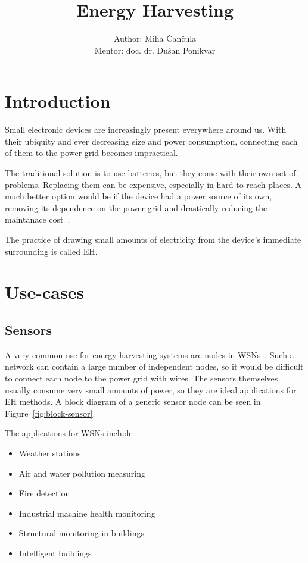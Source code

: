 \documentclass[a4paper,10pt]{article}
\title{Energy Harvesting}
\author{Author: Miha \v Can\v cula \\ Mentor: doc. dr. Du\v san Ponikvar}
\begin{document}
\maketitle

\tableofcontents

\section{Introduction}

Small electronic devices are increasingly present everywhere around us. With their ubiquity and ever decreasing size and power consumption, connecting each of them to the power grid becomes impractical. 

The traditional solution is to use batteries, but they come with their own set of problems. Replacing them can be expensive, especially in hard-to-reach places. A much better option would be if the device had a power source of its own, removing its dependence on the power grid and drastically reducing the maintanace cost~\cite{Burgoine11}. 

The practice of drawing small amounts of electricity from the device's immediate surrounding is called \ac{EH}. 

\section{Use-cases}

\subsection{Sensors}

A very common use for energy harvesting systems are nodes in \acp{WSN}~\cite{teg-wsn-ieee,cap-wsn-ieee}. Such a network can contain a large number of independent nodes, so it would be difficult to connect each node to the power grid with wires. The sensors themselves usually consume very small amounts of power, so they are ideal applications for \acl{EH} methods. A block diagram of a generic sensor node can be seen in Figure~\ref{fig:block-sensor}. 

The applications for \acp{WSN} include~\cite{wiki:eh}:
\begin{itemize}
  \item Weather stations
  \item Air and water pollution measuring
  \item Fire detection
  \item Industrial machine health monitoring
  \item Structural monitoring in buildings
  \item Intelligent buildings~\cite{cap-wsn-ieee}
\end{itemize}
\end{document}
